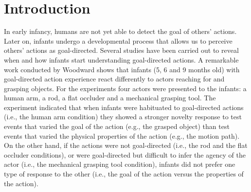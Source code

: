 \documentclass[conference]{IEEEtran}
\begin{document}
\section{Introduction}
In early infancy, humans are not yet able to detect the goal of others' actions. Later on, infants undergo a developmental process that allows us to perceive others' actions as goal-directed. Several studies have been carried out to reveal when and how infants start understanding goal-directed actions. A remarkable work conducted by Woodward \cite{woodward1998infants} shows that infants (5, 6 and 9 months old) with goal-directed action experience react differently to actors reaching for and grasping objects. For the experiments four actors were presented to the infants: a human arm, a rod, a flat occluder and a mechanical grasping tool. The experiment indicated that when infants were habituated to goal-directed actions (i.e., the human arm condition) they showed a stronger novelty response to test events that varied the goal of the action (e.g., the grasped object) than test events that varied the physical properties of the action (e.g., the motion path). On the other hand, if the actions were not goal-directed (i.e., the rod and the flat occluder conditions), or were goal-directed but difficult to infer the agency of the actor (i.e., the mechanical grasping tool condition), infants did not prefer one type of response to the other (i.e., the goal of the action versus the properties of the action).
\end{document}
